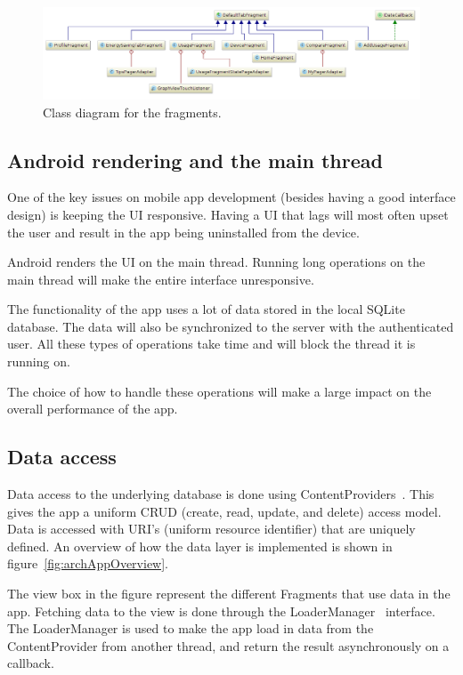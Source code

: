 \begin{figure}[H]
\includegraphics[width=\textwidth]{ch/architecture/fig/class_diagram_fragments.png}
\caption{Class diagram for the fragments.}
\label{fig:classDiagramFragments}
\end{figure}

\subsection{Android rendering and the main thread}
One of the key issues on mobile app development (besides having a good interface design) is keeping the \gls{UI} responsive. Having a UI that lags will most often upset the user and result in the app being uninstalled from the device.

Android renders the UI on the main thread. Running long operations on the main thread will make the entire interface unresponsive.

The functionality of the app uses a lot of data stored in the local SQLite database. The data will also be synchronized to the server with the authenticated user. All these types of operations take time and will block the thread it is running on.

The choice of how to handle these operations will make a large impact on the overall performance of the app.


\subsection{Data access}
Data access to the underlying database is done using ContentProviders~\cite{contentproviders}. This gives the app a uniform \gls{CRUD} (create, read, update, and delete) access model. Data is accessed with \gls{URI}'s (uniform resource identifier) that are uniquely defined. An overview of how the data layer is implemented is shown in figure~\ref{fig:archAppOverview}.

The view box in the figure represent the different Fragments that use data in the app. Fetching data to the view is done through the LoaderManager~\cite{loadermanager} interface. The LoaderManager is used to make the app load in data from the ContentProvider from another thread, and return the result asynchronously on a callback. 

